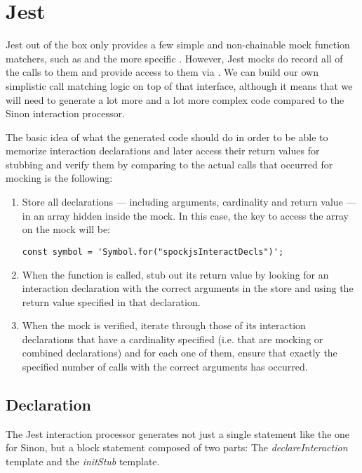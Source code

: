 \section{Jest}
Jest out of the box only provides a few
simple and non-chainable mock function matchers,
such as 
and the more specific .
However, Jest mocks do record
all of the calls to them
and provide access to them via
.
We can build our own simplistic call matching logic
on top of that interface,
although it means that we will need to
generate a lot more and a lot more complex code
compared to the Sinon interaction processor.

The basic idea of what the generated code should do
in order to be able to memorize interaction declarations
and later access their return values for stubbing
and verify them by comparing to the actual calls that occurred for mocking
is the following:
\begin{enumerate}
  \item Store all declarations
    --- including arguments, cardinality and return value ---
    in an array hidden inside the mock.
    In this case, the key to access the array on the mock will be:
    \begin{verbatim}
const symbol = 'Symbol.for("spockjsInteractDecls")';
    \end{verbatim}
  \item When the function is called,
    stub out its return value by
    looking for an interaction declaration
    with the correct arguments in the store
    and using the return value specified in that declaration.
  \item When the mock is verified,
    iterate through those of its interaction declarations
    that have a cardinality specified
    (i.e. that are mocking or combined declarations)
    and for each one of them,
    ensure that exactly the specified number of calls
    with the correct arguments has occurred.
\end{enumerate}

\subsection{Declaration}
The Jest interaction processor generates
not just a single statement like the one for Sinon,
but a block statement composed of two parts:
The \textit{declareInteraction} template and
the \textit{initStub} template.

